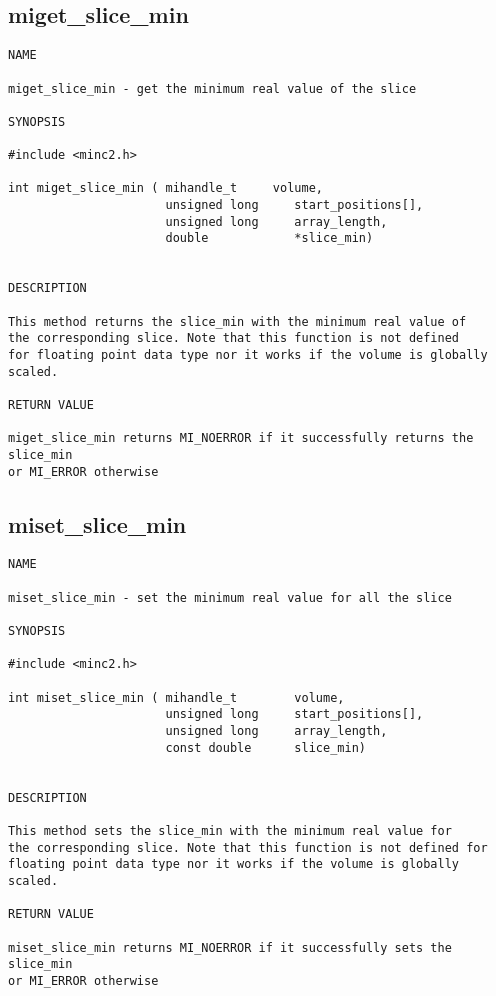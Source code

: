 \documentclass{article}
\begin{document}
\subsection{miget\_slice\_min}
\begin{verbatim}
NAME 

miget_slice_min - get the minimum real value of the slice

SYNOPSIS

#include <minc2.h>

int miget_slice_min ( mihandle_t     volume,
                      unsigned long     start_positions[],
                      unsigned long     array_length,
                      double            *slice_min)
                       
                                
DESCRIPTION

This method returns the slice_min with the minimum real value of
the corresponding slice. Note that this function is not defined 
for floating point data type nor it works if the volume is globally scaled.

RETURN VALUE

miget_slice_min returns MI_NOERROR if it successfully returns the slice_min
or MI_ERROR otherwise
\end{verbatim}

\subsection{miset\_slice\_min}
\begin{verbatim}
NAME 

miset_slice_min - set the minimum real value for all the slice

SYNOPSIS

#include <minc2.h>

int miset_slice_min ( mihandle_t        volume,
                      unsigned long     start_positions[],
                      unsigned long     array_length,
                      const double      slice_min)
                       
                                
DESCRIPTION

This method sets the slice_min with the minimum real value for
the corresponding slice. Note that this function is not defined for
floating point data type nor it works if the volume is globally scaled.

RETURN VALUE

miset_slice_min returns MI_NOERROR if it successfully sets the slice_min
or MI_ERROR otherwise
\end{verbatim}
\end{document}
